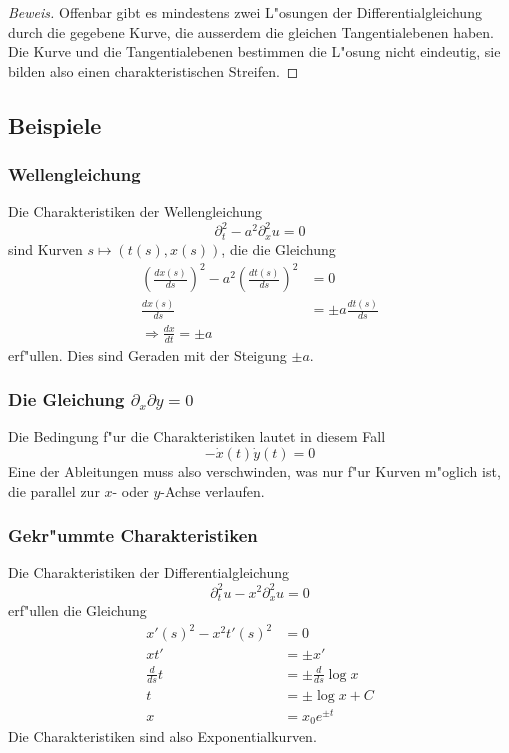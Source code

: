 \begin{proof}[Beweis]
Offenbar gibt es mindestens zwei L"osungen der Differentialgleichung
durch die gegebene Kurve, die ausserdem die gleichen Tangentialebenen
haben. Die Kurve und die Tangentialebenen bestimmen die L"osung nicht
eindeutig, sie bilden also einen charakteristischen Streifen.
\end{proof}

\subsection{Beispiele}
\subsubsection{Wellengleichung}
Die Charakteristiken der Wellengleichung
\[
\partial_t^2-a^2\partial_x^2u=0
\]
sind Kurven $s\mapsto(t(s),x(s))$, die die Gleichung
\begin{align*}
\left(
\frac{dx(s)}{ds}\right)^2-a^2\left(\frac{dt(s)}{ds}\right)^2&=0
\\
\frac{dx(s)}{ds}
&=
\pm a\frac{dt(s)}{ds}
\\
\Rightarrow
\frac{dx}{dt}=\pm a
\end{align*}
erf"ullen. Dies sind Geraden mit der Steigung $\pm a$.

\subsubsection{Die Gleichung $\partial_x\partial y=0$} Die Bedingung f"ur die
Charakteristiken lautet in diesem Fall
\[
-\dot x(t)\dot y(t)=0
\]
Eine der Ableitungen muss also verschwinden, was nur f"ur Kurven
m"oglich ist, die parallel zur $x$- oder $y$-Achse verlaufen.

\subsubsection{Gekr"ummte Charakteristiken}
Die Charakteristiken der Differentialgleichung
\[
\partial_t^2u-x^2\partial_x^2u=0
\]
erf"ullen die Gleichung
\begin{align*}
x'(s)^2-x^2t'(s)^2&=0
\\
xt'&=\pm  x'
\\
\frac{d}{ds}t&=\pm\frac{d}{ds}\log x
\\
t&=\pm\log x+C
\\
x&=x_0e^{\pm t}
\end{align*}
Die Charakteristiken sind also Exponentialkurven.

